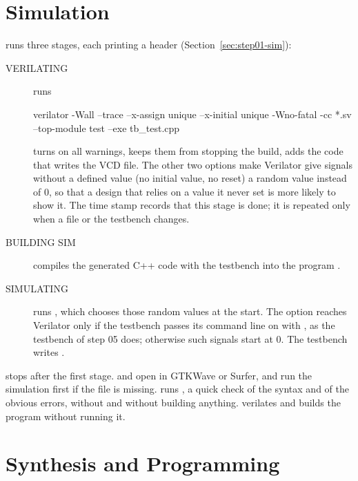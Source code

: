 \section{Simulation}

\textbf{} runs three stages, each printing a header
(Section~\ref{sec:step01-sim}):
\begin{description}
\item[VERILATING] runs
\begin{terminal}
verilator -Wall --trace --x-assign unique --x-initial unique -Wno-fatal
          -cc *.sv --top-module test --exe tb_test.cpp
\end{terminal}
   turns on all warnings,  keeps them from stopping
  the build,  adds the code that writes the VCD file. The other two
  options make Verilator give signals without a defined value (no initial value,
  no reset) a random value instead of 0, so that a design that relies on a
  value it never set is more likely to show it. The time stamp
   records that this stage is done; it is repeated only
  when a  file or the testbench changes.
\item[BUILDING SIM] compiles the generated C++ code with the testbench into
  the program .
\item[SIMULATING] runs , which
  chooses those random values at the start. The option reaches Verilator only
  if the testbench passes its command line on with
  , as the testbench of step 05 does;
  otherwise such signals start at 0. The testbench writes
  .
\end{description}
\textbf{} stops after the first stage. \textbf{} and \textbf{} open  in GTKWave or
Surfer, and run the simulation first if the file is missing.
\textbf{} runs , a quick check of the
syntax and of the obvious errors, without  and without building
anything. \textbf{} verilates and builds the program
 without running it.

\section{Synthesis and Programming}

